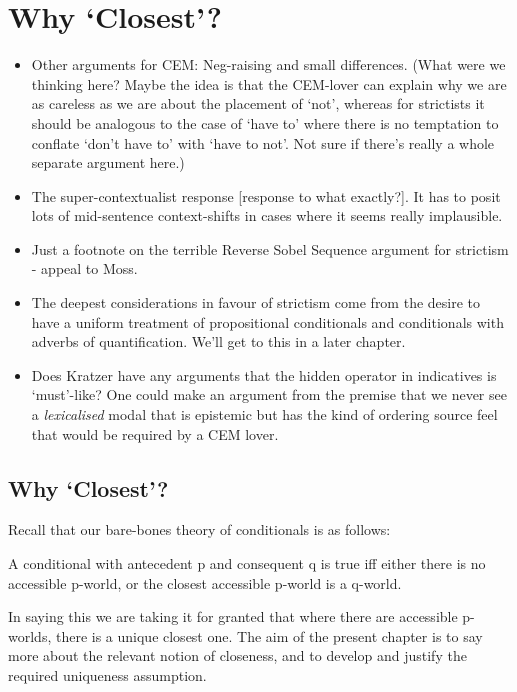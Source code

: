 \documentclass[If.tex]{subfiles}
\begin{document}
\chapter{Why ‘Closest’?}
\label{chap:cem}
\begin{itemize}
	\item
	Other arguments for CEM: Neg-raising and small differences.
	(What were we thinking here?  Maybe the idea is that the CEM-lover can explain why we are as careless as we are about the placement of ‘not’, whereas for strictists it should be analogous to the case of ‘have to’ where there is no temptation to conflate ‘don't have to’ with ‘have to not’.  Not sure if there's really a whole separate argument here.)
	\item
	The super-contextualist response [response to what exactly?]. It has to posit lots of mid-sentence context-shifts in cases where it seems really implausible.
	\item
	Just a footnote on the terrible Reverse Sobel Sequence argument for strictism - appeal to Moss.
	\item
	The deepest considerations in favour of strictism come from the desire to have a uniform treatment of propositional conditionals and conditionals with adverbs of quantification. We'll get to this in a later chapter.
	\item
	Does Kratzer have any arguments that the hidden operator in indicatives is ‘must’-like? One could make an argument from the premise that we never see a \emph{lexicalised} modal that is epistemic but has the kind of ordering source feel that would be required by a CEM lover.
\end{itemize}

\section{\texorpdfstring{Why ‘Closest’?}{Why Closest?}}\label{why-closest}

Recall that our bare-bones theory of conditionals is as follows:
\begin{prop}
\litem[CLOSEST] \label{closest}
	A conditional with antecedent p and consequent q is true iff either there is no accessible p-world, or the closest accessible p-world is a q-world.
\end{prop}
In saying this we are taking it for granted that where there are accessible p-worlds, there is a unique closest one. The aim of the present chapter is to say more about the relevant notion of closeness, and to develop and justify the required uniqueness assumption.
\end{document}
